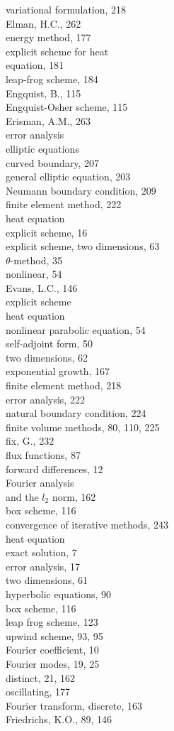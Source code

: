 \documentclass[10pt]{article}
\begin{document}
variational formulation, 218\\
Elman, H.C., 262\\
energy method, 177\\
explicit scheme for heat\\
equation, 181\\
leap-frog scheme, 184\\
Engquist, B., 115\\
Engquist-Osher scheme, 115\\
Erisman, A.M., 263\\
error analysis\\
elliptic equations\\
curved boundary, 207\\
general elliptic equation, 203\\
Neumann boundary condition, 209\\
finite element method, 222\\
heat equation\\
explicit scheme, 16\\
explicit scheme, two dimensions, 63\\
\(\theta\)-method, 35\\
nonlinear, 54\\
Evans, L.C., 146\\
explicit scheme\\
heat equation\\
nonlinear parabolic equation, 54\\
self-adjoint form, 50\\
two dimensions, 62\\
exponential growth, 167\\
finite element method, 218\\
error analysis, 222\\
natural boundary condition, 224\\
finite volume methods, 80, 110, 225\\
fix, G., 232\\
flux functions, 87\\
forward differences, 12\\
Fourier analysis\\
and the \(l_{2}\) norm, 162\\
box scheme, 116\\
convergence of iterative methods, 243\\
heat equation\\
exact solution, 7\\
error analysis, 17\\
two dimensions, 61\\
hyperbolic equations, 90\\
box scheme, 116\\
leap frog scheme, 123\\
upwind scheme, 93, 95\\
Fourier coefficient, 10\\
Fourier modes, 19, 25\\
distinct, 21, 162\\
oscillating, 177\\
Fourier transform, discrete, 163\\
Friedrichs, K.O., 89, 146
\end{document}
